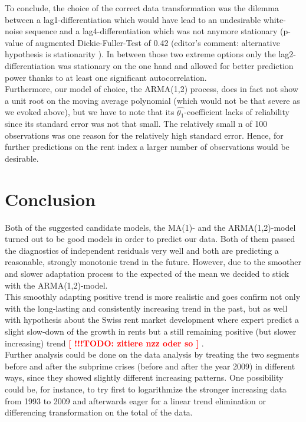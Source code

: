 \documentclass[11pt,a4paper]{article}
\newcommand{\TODO}[1]{%
    \textcolor{red}{ %
        \textbf{[ !!!TODO: #1 ]}%
    }%
    \PackageWarning{TODO:}{TODO: #1}%
}
\begin{document}
To conclude, the choice of the correct data transformation was the dilemma between a lag1-differentiation which would have lead to an undesirable white-noise sequence and a lag4-differentiation which was not anymore stationary (p-value of augmented Dickie-Fuller-Test of 0.42 (editor's comment: alternative hypothesis is stationarity \citep{adf}). In between those two extreme options only the lag2-differentiation was stationary on the one hand and allowed for better prediction power thanks to at least one significant autocorrelation. \\
Furthermore, our model of choice, the ARMA(1,2) process, does in fact not show a unit root on the moving average polynomial (which would not be that severe as we evoked above), but we have to note that its $\hat{\theta_1}$-coefficient lacks of reliability since its standard error was not that small. The relatively small n of 100 observations was one reason for the relatively high standard error. Hence, for further predictions on the rent index a larger number of observations would be desirable.




\section{Conclusion}

Both of the suggested candidate models, the MA(1)- and the ARMA(1,2)-model turned out to be good models in order to predict our data. Both of them passed the diagnostics of independent residuals very well and both are predicting a reasonable, strongly monotonic trend in the future. However, due to the smoother and slower adaptation process to the expected of the mean we decided to stick with the ARMA(1,2)-model.
\\
This smoothly adapting positive trend is more realistic and goes confirm not only with the long-lasting and consistently increasing trend in the past, but as well with hypothesis about the Swiss rent market development where expert predict a slight slow-down of the growth in rents but a still remaining positive (but slower increasing) trend \TODO{zitiere nzz oder so}. \\

Further analysis could be done on the data analysis by treating the two segments before and after the subprime crises (before and after the year 2009) in different ways, since they showed slightly different increasing patterns. One possibility could be, for instance, to try first to logarithmize the stronger increasing data from 1993 to 2009 and afterwards eager for a linear trend elimination or differencing transformation on the total of the data.  \\
\end{document}
